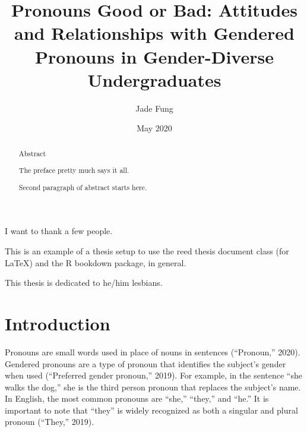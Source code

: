 \documentclass[12pt,twoside]{reedthesis}
\title{Pronouns Good or Bad: Attitudes and Relationships with Gendered Pronouns
in Gender-Diverse Undergraduates}
\author{Jade Fung}
\date{May 2020}
\begin{document}
  \maketitle

\frontmatter %
\pagestyle{empty} %
  \begin{acknowledgements}
    I want to thank a few people.
  \end{acknowledgements}
  \begin{preface}
    This is an example of a thesis setup to use the reed thesis document
    class (for LaTeX) and the R bookdown package, in general.
  \end{preface}
  \hypersetup{linkcolor=black}
  \setcounter{tocdepth}{2}
  \tableofcontents

  \listoftables

  \listoffigures
  \begin{abstract}
    \chapter{Abstract}\label{abstract}
    
    The preface pretty much says it all. \par
    
    Second paragraph of abstract starts here.
  \end{abstract}
  \begin{dedication}
    This thesis is dedicated to he/him lesbians.
  \end{dedication}
\mainmatter %
\pagestyle{fancyplain} %

\chapter*{Introduction}\label{introduction}

Pronouns are small words used in place of nouns in sentences
(``Pronoun,'' 2020). Gendered pronouns are a type of pronoun that
identifies the subject's gender when used (``Preferred gender pronoun,''
2019). For example, in the sentence ``she walks the dog,'' she is the
third person pronoun that replaces the subject's name. In English, the
most common pronouns are ``she,'' ``they,'' and ``he.'' It is important
to note that ``they'' is widely recognized as both a singular and plural
pronoun (``They,'' 2019).
\end{document}
